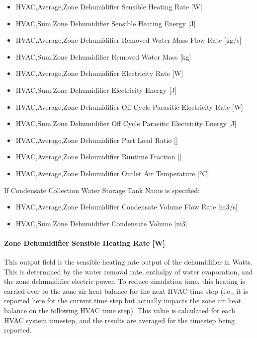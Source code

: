 \begin{itemize}
\item
  HVAC,Average,Zone Dehumidifier Sensible Heating Rate {[}W{]}
\item
  HVAC,Sum,Zone Dehumidifier Sensible Heating Energy {[}J{]}
\item
  HVAC,Average,Zone Dehumidifier Removed Water Mass Flow Rate {[}kg/s{]}
\item
  HVAC,Sum,Zone Dehumidifier Removed Water Mass {[}kg{]}
\item
  HVAC,Average,Zone Dehumidifier Electricity Rate {[}W{]}
\item
  HVAC,Sum,Zone Dehumidifier Electricity Energy {[}J{]}
\item
  HVAC,Average,Zone Dehumidifier Off Cycle Parasitic Electricity Rate {[}W{]}
\item
  HVAC,Sum,Zone Dehumidifier Off Cycle Parasitic Electricity Energy {[}J{]}
\item
  HVAC,Average,Zone Dehumidifier Part Load Ratio {[]}
\item
  HVAC,Average,Zone Dehumidifier Runtime Fraction {[]}
\item
  HVAC,Average,Zone Dehumidifier Outlet Air Temperature {[}\si{\degreeCelsius}{]}
\end{itemize}

If Condensate Collection Water Storage Tank Name is specified:

\begin{itemize}
\item
  HVAC,Average,Zone Dehumidifier Condensate Volume Flow Rate {[}m3/s{]}
\item
  HVAC,Sum,Zone Dehumidifier Condensate Volume {[}m3{]}
\end{itemize}

\paragraph{Zone Dehumidifier Sensible Heating Rate {[}W{]}}\label{zone-dehumidifier-sensible-heating-rate-w}

This output field is the sensible heating rate output of the dehumidifier in Watts. This is determined by the water removal rate, enthalpy of water evaporation, and the zone dehumidifier electric power. To reduce simulation time, this heating is carried over to the zone air heat balance for the next HVAC time step (i.e., it is reported here for the current time step but actually impacts the zone air heat balance on the following HVAC time step). This value is calculated for each HVAC system timestep, and the results are averaged for the timestep being reported.

